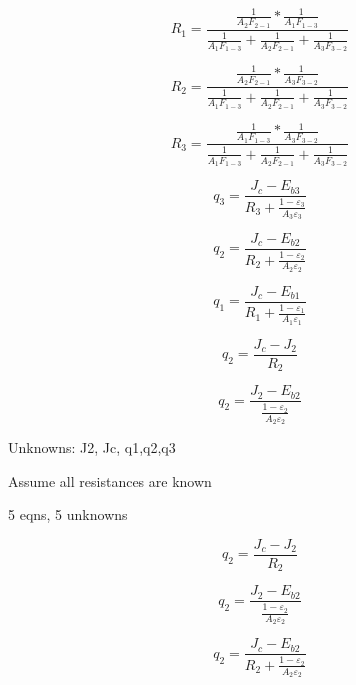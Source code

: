 \documentclass[12pt]{article}
\renewcommand{\_}{\kern-1.5pt\textunderscore\kern-1.5pt}
\begin{document}
\par


\vspace{\baselineskip}
\par

 \[ R_{1}=\frac{\frac{1}{A_{2}F_{2-1}}\ast\frac{1}{A_{1}F_{1-3}}}{\frac{1}{A_{1}F_{1-3}}+\frac{1}{A_{2}F_{2-1}}+\frac{1}{A_{3}F_{3-2}}} \] \par

 \[ R_{2}=\frac{\frac{1}{A_{2}F_{2-1}}\ast\frac{1}{A_{3}F_{3-2}}}{\frac{1}{A_{1}F_{1-3}}+\frac{1}{A_{2}F_{2-1}}+\frac{1}{A_{3}F_{3-2}}} \] \par

 \[ R_{3}=\frac{\frac{1}{A_{1}F_{1-3}}\ast\frac{1}{A_{3}F_{3-2}}}{\frac{1}{A_{1}F_{1-3}}+\frac{1}{A_{2}F_{2-1}}+\frac{1}{A_{3}F_{3-2}}} \] \par

\par

 \[ q_{3}=\frac{J_{c}-E_{b3}}{R_{3}+\frac{1- \varepsilon _{3}}{A_{3} \varepsilon _{3}}} \] \par

 \[ q_{2}=\frac{J_{c}-E_{b2}}{R_{2}+\frac{1- \varepsilon _{2}}{A_{2} \varepsilon _{2}}} \] \par

 \[ q_{1}=\frac{J_{c}-E_{b1}}{R_{1}+\frac{1- \varepsilon _{1}}{A_{1} \varepsilon _{1}}} \] \par

 \[ q_{2}=\frac{J_{c}-J_{2}}{R_{2}} \] \par

 \[ q_{2}=\frac{J_{2}-E_{b2}}{\frac{1- \varepsilon _{2}}{A_{2} \varepsilon _{2}}} \] \par

Unknowns: J2, Jc, q1,q2,q3\par

Assume all resistances are known\par

5 eqns, 5 unknowns\par

 \[ q_{2}=\frac{J_{c}-J_{2}}{R_{2}} \] \par

 \[ q_{2}=\frac{J_{2}-E_{b2}}{\frac{1- \varepsilon _{2}}{A_{2} \varepsilon _{2}}} \] \par

 \[ q_{2}=\frac{J_{c}-E_{b2}}{R_{2}+\frac{1- \varepsilon _{2}}{A_{2} \varepsilon _{2}}} \] \par
\end{document}

